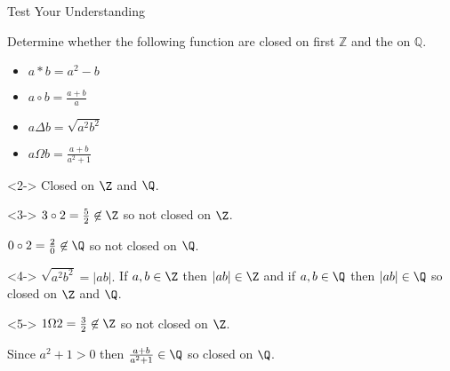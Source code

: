 \documentclass[8pt]{beamer}
\begin{document}
\begin{frame}{Test Your Understanding}
	\begin{problem}
	Determine whether the following function are closed on first $ \mathbb{Z}$ and the on $\mathbb{Q}.$
\begin{itemize}
	\item $a*b=a^2-b$
	\item $a \circ b = \frac{a+b}{a}$
	\item $a\Delta b= \sqrt{a^2b^2} $
	\item $a\Omega b=\frac{a+b}{a^2+1}$
\end{itemize}
 \end{problem}
	
 \begin{solution}<2->
Closed on $\Z$ and $\Q$.
 \end{solution}

 \begin{solution}<3->
 	$3\circ 2=\frac{5}{2}\not\in \Z$ so not closed on $\Z$.

	$0\circ 2=\frac{2}{0}\not\in \Q$ so not closed on $\Q$.

 \end{solution}

\begin{solution}<4->
	$\sqrt{a^2b^2}=|ab| .$ If $a,b \in \Z$ then $|ab|\in \Z$ and if $a,b \in \Q$ then $|ab| \in \Q$ so closed on $\Z$ and $\Q$. 
\end{solution}

\begin{solution}<5->
	$1\Omega 2=\frac{3}{2}\not\in \Z$ so not closed on $\Z$.

	Since $a^2+1>0$ then $\frac{a+b}{a^2+1}\in \Q$ so closed on $\Q$.
\end{solution}
\end{frame}
\end{document}
